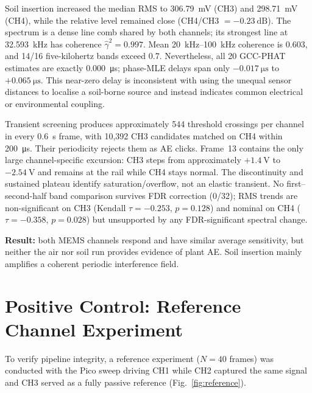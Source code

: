\documentclass[10pt,a4paper,twocolumn]{article}
\newcommand{\gammasq}{\ensuremath{\hat{\gamma}^2}}
\begin{document}
Soil insertion increased the median RMS to \SI{306.79}{\milli\volt} (CH3) and \SI{298.71}{\milli\volt} (CH4), while the relative level remained close (CH4/CH3 $=-\SI{0.23}{\deci\bel}$). The spectrum is a dense line comb shared by both channels; its strongest line at \SI{32.593}{\kilo\hertz} has coherence $\gammasq=0.997$. Mean \SIrange{20}{100}{\kilo\hertz} coherence is 0.603, and 14/16 five-kilohertz bands exceed 0.7. Nevertheless, all 20 GCC-PHAT estimates are exactly \SI{0.000}{\micro\second}; phase-MLE delays span only $-\SI{0.017}{\micro\second}$ to $+\SI{0.065}{\micro\second}$. This near-zero delay is inconsistent with using the unequal sensor distances to localise a soil-borne source and instead indicates common electrical or environmental coupling.

Transient screening produces approximately 544 threshold crossings per channel in every \SI{0.6}{\second} frame, with 10,392 CH3 candidates matched on CH4 within \SI{200}{\micro\second}. Their periodicity rejects them as AE clicks. Frame~13 contains the only large channel-specific excursion: CH3 steps from approximately $+\SI{1.4}{\volt}$ to $-\SI{2.54}{\volt}$ and remains at the rail while CH4 stays normal. The discontinuity and sustained plateau identify saturation/overflow, not an elastic transient. No first--second-half band comparison survives FDR correction (0/32); RMS trends are non-significant on CH3 (Kendall $\tau=-0.253$, $p=0.128$) and nominal on CH4 ($\tau=-0.358$, $p=0.028$) but unsupported by any FDR-significant spectral change.

\textbf{Result:} both MEMS channels respond and have similar average sensitivity, but neither the air nor soil run provides evidence of plant AE. Soil insertion mainly amplifies a coherent periodic interference field.



\section{Positive Control: Reference Channel Experiment}
\label{sec:ref}

To verify pipeline integrity, a reference experiment ($N=40$ frames) was conducted with the Pico sweep driving CH1 while CH2 captured the same signal and CH3 served as a fully passive reference (Fig.~\ref{fig:reference}).
\end{document}

